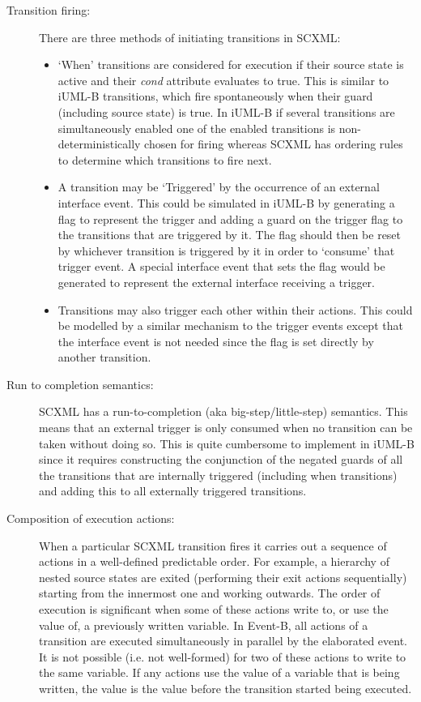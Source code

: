 \begin{description}

\item [Transition firing:]

There are three methods of initiating transitions in SCXML:
\begin{itemize}
\item `When' transitions are considered for execution if their source state is active and their \emph{cond} attribute evaluates to true. 
This is similar to iUML-B transitions, which fire spontaneously when their guard (including source state) is true.
In iUML-B if several transitions are simultaneously enabled one of the enabled transitions is non-deterministically chosen for firing whereas 
SCXML has ordering rules to determine which transitions to fire next.
\item A transition may be `Triggered' by the occurrence of an external interface event. 
This could be simulated in iUML-B by generating a flag to represent the trigger and adding a guard on the trigger flag to the transitions that are triggered by it. 
The flag should then be reset by whichever transition is triggered by it in order to `consume' that trigger event.
 A special interface event that sets the flag would be generated to represent the external interface receiving a trigger.
\item Transitions may also trigger each other within their actions. 
This could be modelled by a similar mechanism to the trigger events except that the interface event is not needed since the flag is set directly by another transition.
\end{itemize}

\item [Run to completion semantics:] 
SCXML has a run-to-completion (aka big-step/little-step) semantics.
 This means that an external trigger is only consumed when no transition can be taken without doing so. 
This is quite cumbersome to implement in iUML-B since it requires constructing the conjunction of the negated guards of all the transitions that are internally triggered (including when transitions) and adding this to all externally triggered transitions.

\item [Composition of execution actions:]
When a particular SCXML transition fires it carries out a sequence of actions in a well-defined predictable order. 
For example, a hierarchy of nested source states are exited (performing their exit actions sequentially) starting from the innermost one and working outwards.
The order of execution is significant when some of these actions write to, or use the value of, a previously written variable. 
In Event-B, all actions of a transition are executed simultaneously in parallel by the elaborated event. 
It  is not possible (i.e. not well-formed) for two of these actions to write to the same variable.
If any actions use the value of a variable that is being written, the value is the value before the transition started being executed.


\end{description}
